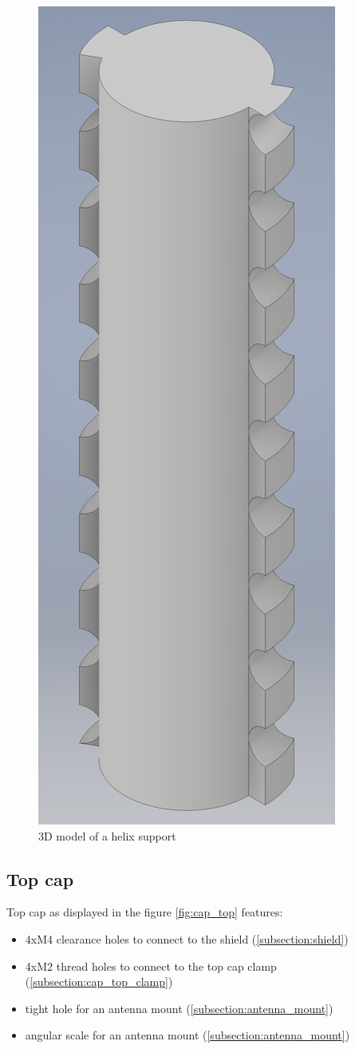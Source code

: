 \begin{figure}[h]
	\centering
	\includegraphics[width=.46\textwidth]{images/coil_support_small}
	\caption{3D model of a helix support}
	\label{fig:helix_support}
\end{figure}

\clearpage
\subsection{Top cap}
\label{subsection:cap_top}
Top cap as displayed in the figure \ref{fig:cap_top} features:
\begin{itemize}
	\item 4xM4 clearance holes to connect to the shield (\ref{subsection:shield})
	\item 4xM2 thread holes to connect to the top cap clamp (\ref{subsection:cap_top_clamp})
	\item tight hole for an antenna mount (\ref{subsection:antenna_mount})
	\item angular scale for an antenna mount (\ref{subsection:antenna_mount})
\end{itemize}

